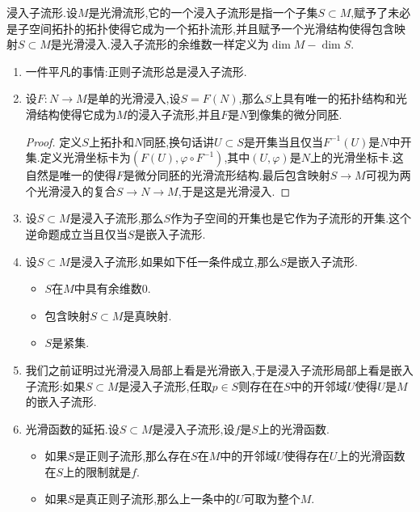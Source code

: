 浸入子流形.设$M$是光滑流形,它的一个浸入子流形是指一个子集$S\subset M$,赋予了未必是子空间拓扑的拓扑使得它成为一个拓扑流形,并且赋予一个光滑结构使得包含映射$S\subset M$是光滑浸入.浸入子流形的余维数一样定义为$\dim M-\dim S$.
\begin{enumerate}
	\item 一件平凡的事情:正则子流形总是浸入子流形.
	\item 设$F:N\to M$是单的光滑浸入,设$S=F(N)$,那么$S$上具有唯一的拓扑结构和光滑结构使得它成为$M$的浸入子流形,并且$F$是$N$到像集的微分同胚.
	\begin{proof}
		
		定义$S$上拓扑和$N$同胚,换句话讲$U\subset S$是开集当且仅当$F^{-1}(U)$是$N$中开集.定义光滑坐标卡为$(F(U),\varphi\circ F^{-1})$,其中$(U,\varphi)$是$N$上的光滑坐标卡.这自然是唯一的使得$F$是微分同胚的光滑流形结构.最后包含映射$S\to M$可视为两个光滑浸入的复合$S\to N\to M$,于是这是光滑浸入.
	\end{proof}
    \item 设$S\subset M$是浸入子流形,那么$S$作为子空间的开集也是它作为子流形的开集.这个逆命题成立当且仅当$S$是嵌入子流形.
    \item 设$S\subset M$是浸入子流形,如果如下任一条件成立,那么$S$是嵌入子流形.
    \begin{itemize}
    	\item $S$在$M$中具有余维数0.
    	\item 包含映射$S\subset M$是真映射.
    	\item $S$是紧集.
    \end{itemize}
    \item 我们之前证明过光滑浸入局部上看是光滑嵌入,于是浸入子流形局部上看是嵌入子流形:如果$S\subset M$是浸入子流形,任取$p\in S$则存在在$S$中的开邻域$U$使得$U$是$M$的嵌入子流形.
    \item 光滑函数的延拓.设$S\subset M$是浸入子流形,设$f$是$S$上的光滑函数.
    \begin{itemize}
    	\item 如果$S$是正则子流形,那么存在$S$在$M$中的开邻域$U$使得存在$U$上的光滑函数在$S$上的限制就是$f$.
    	\item 如果$S$是真正则子流形,那么上一条中的$U$可取为整个$M$.
    \end{itemize}
\end{enumerate}

